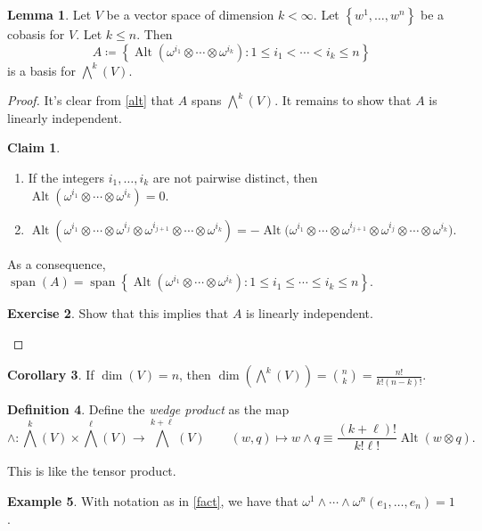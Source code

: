 \documentclass[10pt,letterpaper,cm]{nupset}
\theoremstyle{definition}
\newtheorem{definition}{Definition}[subsection]
\newtheorem{exmp}[definition]{Example}
\theoremstyle{theorem}
\newtheorem{lemma}[definition]{Lemma}
\newtheorem{corollary}[definition]{Corollary}
\newtheorem*{claim}{Claim}
\newtheorem{exercise}[definition]{Exercise}
\theoremstyle{remark}
\newcommand{\1}{\mathbf{1}}
\newcommand{\0}{\vec 0}
\DeclareMathOperator*{\Span}{span}
\DeclareMathOperator{\Alt}{Alt}
\begin{document}
\begin{lemma}\label{bass}
Let $V$ be a vector space of dimension $k<\infty$. Let $\left\{w^1, \ldots, w^n\right\}$ be a cobasis for $V$. Let $k\leq n$. Then $$A\coloneqq   \left\{\Alt(\omega^{i_1} \otimes \cdots \otimes \omega^{i_k}) : 1 \leq i_1 < \cdots < i_k \leq n \right\} $$ is a basis for $\bigwedge^k(V)$.
\end{lemma}
\begin{proof}
It's clear from \cref{alt} that $A$ spans $\bigwedge^k(V)$. It remains to show that $A$ is linearly independent. 
\begin{claim} $ $
\begin{enumerate}[label=(\alph*)]
\item If the integers $i_1, \ldots, i_k$ are not pairwise distinct, then $\Alt(\omega^{i_1} \otimes \cdots \otimes \omega^{i_k}) = 0$.
\item $\Alt(\omega^{i_1} \otimes \cdots \otimes \omega^{i_j} \otimes \omega^{i_{j+1}} \otimes \cdots \otimes \omega^{i_k}) = {-\Alt(\omega^{i_1}} \otimes \cdots \otimes \omega^{i_{j+1}} \otimes \omega^{i_{j}} \otimes \cdots \otimes \omega^{i_k}).$
\end{enumerate}
\end{claim}%

As a consequence, $\Span(A) = \Span{\left\{\Alt(\omega^{i_1} \otimes \cdots \otimes \omega^{i_k}) : 1 \leq i_1 \leq \cdots \leq i_k \leq n\right \}}$.

\begin{exercise}
Show that this implies that $A$ is linearly independent.
\end{exercise}
\end{proof}

\begin{corollary}
If $\dim(V) = n$, then $\dim\left(\bigwedge^k(V)\right) = {n\choose k} = \frac{n!}{k!(n-k)!}$.
\end{corollary}

\begin{definition}\label{WP}
Define the \textit{wedge product} as the map $$\wedge : \bigwedge^k(V) \times \bigwedge^{\ell}(V) \to \bigwedge^{k+\ell}(V) \quad \quad (w, q) \mapsto w \wedge q \equiv  \frac{(k+\ell)!}{k! \ell!}\Alt(w\otimes q).$$  
\end{definition}

This is like the tensor product. 

\begin{exmp}
With notation as in \cref{fact}, we have that $\omega^1 \wedge \cdots \wedge \omega^n(e_1, \ldots, e_n) =1$.
\end{exmp}
\end{document}
